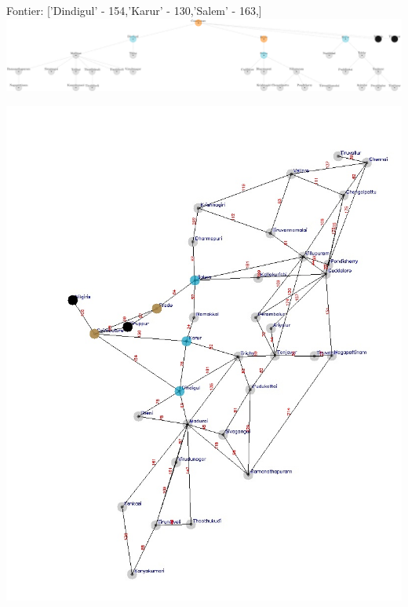 \documentclass[xcolor=table]{beamer}
\begin{document}
\begin{frame}
  { \tiny Fontier: ['Dindigul' - 154,'Karur' - 130,'Salem' - 163,] }
  \includegraphics[width=1\textwidth]{../UCSNodes/8-1.png}
  \begin{center}
    \includegraphics[height=0.6\textheight]{../UCSoutput/tamilUCS6.jpg}
  \end{center}
\end{frame}
\end{document}
